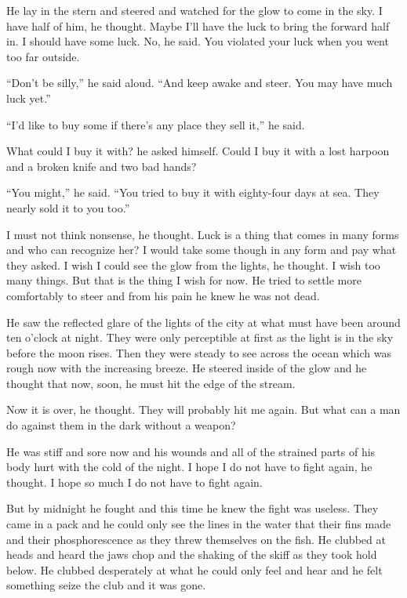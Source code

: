 \documentclass[fontset=ubuntu]{ctexrep}
\begin{document}
He lay in the stern and steered and watched for the glow to come in the
sky. I have half of him, he thought. Maybe I'll have the luck to bring the
forward half in. I should have some luck. No, he said. You \gls{violated} your
luck when you went too far outside.

``Don't be silly,'' he said aloud. ``And keep awake and steer. You may have
much luck yet.''

``I'd like to buy some if there's any place they sell it,'' he said.

What could I buy it with? he asked himself. Could I buy it with a lost
harpoon and a broken knife and two bad hands?

``You might,'' he said. ``You tried to buy it with eighty-four days at sea.
They nearly sold it to you too.''

I must not think nonsense, he thought. Luck is a thing that comes in many
forms and who can \gls{recognize} her? I would take some though in any form
and pay what they asked. I wish I could see the glow from the lights, he
thought. I wish too many things. But that is the thing I wish for now. He
tried to settle more comfortably to steer and from his pain he knew he was
not dead.

He saw the \gls{reflected} glare of the lights of the city at what must have
been around ten o'clock at night. They were only \gls{perceptible} at first
as the light is in the sky before the moon rises. Then they were steady to
see across the ocean which was rough now with the increasing breeze. He
steered inside of the glow and he thought that now, soon, he must hit the
edge of the stream.

Now it is over, he thought. They will probably hit me again. But what can a
man do against them in the dark without a weapon?

He was stiff and sore now and his wounds and all of the \gls{strained}
parts of his body hurt with the cold of the night. I hope I do not have to
fight again, he thought. I hope so much I do not have to fight again.

But by midnight he fought and this time he knew the fight was \gls{useless}.
They came in a pack and he could only see the lines in the water that their
fins made and their phosphorescence as they threw themselves on the fish. He
clubbed at heads and heard the jaws chop and the shaking of the skiff as
they took hold below. He clubbed desperately at what he could only feel and
hear and he felt something \gls{seize} the club and it was gone.
\end{document}
